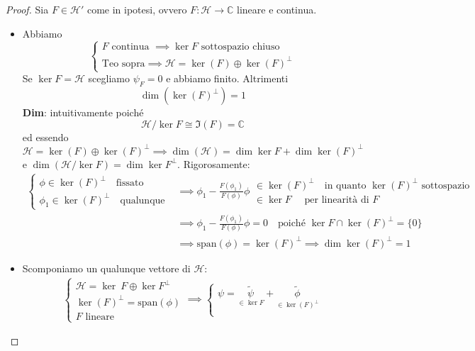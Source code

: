 \documentclass[a4paper,10pt]{article}
\theoremstyle{definition}
\newcommand{\im}{\mathbb{C}} %
\newcommand{\hil}{\mathcal{H}} %
\theoremstyle{indentdefinition}
\theoremstyle{indenttheorem}
\theoremstyle{myremark}
\theoremstyle{indentgeneral}
\begin{document}
\begin{proof}
    Sia $F\in \hil'$ come in ipotesi, ovvero $F:\hil\to\im$ lineare e continua.
    \begin{itemize}
        \item  Abbiamo $$\begin{cases}
            F \text{ continua }\implies\ker F\text { sottospazio chiuso }\\
            \text{Teo sopra}\implies \hil=\ker (F)\oplus \ker(F)^\perp
        \end{cases}$$
        Se $\ker F=\hil$ scegliamo $\psi_F=0$ e abbiamo finito. Altrimenti 
        $$\boxed{\dim(\ker(F)^\perp)=1}$$
        \textbf{Dim}: intuitivamente poiché 
        $$\hil/\ker F\cong \Im(F)=\im $$
        ed essendo  $\hil=\ker (F)\oplus \ker(F)^\perp\implies \dim(\hil)=\dim \ker F+\dim\ker(F)^\perp$ e $\dim(\hil/\ker F)=\dim\ker F^\perp$. Rigorosamente:
        \begin{align*}
            \begin{cases}
                \phi\in \ker (F)^\perp \quad \text{fissato}\\
                \phi_1\in\ker (F)^\perp \quad \text{qualunque}
            \end{cases}&\implies
                \phi_1-\frac{F(\phi_1)}{F(\phi)}\phi\begin{array}{l}
                     \in \ker (F)^\perp \quad \text{in quanto $\ker (F)^\perp$ sottospazio}\\
                     \in\ker F \quad \text{ per linearità di }F
                \end{array}\\
                &\implies \phi_1-\frac{F(\phi_1)}{F(\phi)}\phi=0 \quad \text{poiché }\ker F\cap \ker(F)^\perp =\{0\}\\
                &\implies \text{span}(\phi)=\ker (F)^\perp  \implies \dim\ker (F)^\perp =1
        \end{align*}
        \item Scomponiamo un qualunque vettore di $\hil$:
        \begin{align*}
        \begin{cases}
            \hil=\ker\ F\oplus \ker F^\perp\\
            \ker (F)^\perp=\text{span}(\phi)\\
            F \text{ lineare}
        \end{cases}\implies
            \begin{cases}
                \psi=\underset{\in\ker F}{\widetilde{\psi}}+\underset{\in\ker (F)^\perp}{\widetilde{\phi}}\\

\end{cases}
\end{align*}
\end{itemize}
\end{proof}
\end{document}
